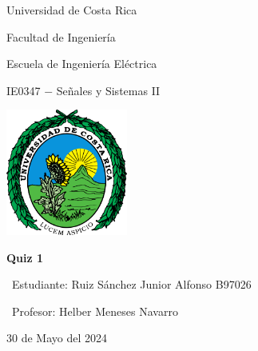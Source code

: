 


 

\begin{titlepage}
  \centering
  {\LARGE Universidad de Costa Rica \par} %
  {\Large Facultad de Ingeniería \par} %
  {\Large Escuela de Ingeniería Eléctrica \par} %
  {\Large IE0347 $-$ Señales y Sistemas II \par} %
  \vspace{2cm}
  
  \includegraphics[width=0.3\textwidth]{IMG/imagen1.png} %
  \vspace{1cm}

  {\huge\bfseries Quiz 1 \par} %
  \vspace{2cm}
  
  {\Large\ Estudiante: Ruiz Sánchez Junior Alfonso B97026 \par} %
  {\Large\ Profesor: Helber Meneses Navarro \par} %
  \vfill
  
  {\large 30 de Mayo del 2024 \par} %
  \vspace*{\fill}
  
\end{titlepage}

\thispagestyle{empty} %

\renewcommand{\thepage}{\roman{page}}
\newpage

\renewcommand{\thepage}{\arabic{page}} 
\setcounter{page}{1}

\newpage

\newpage

\newpage





